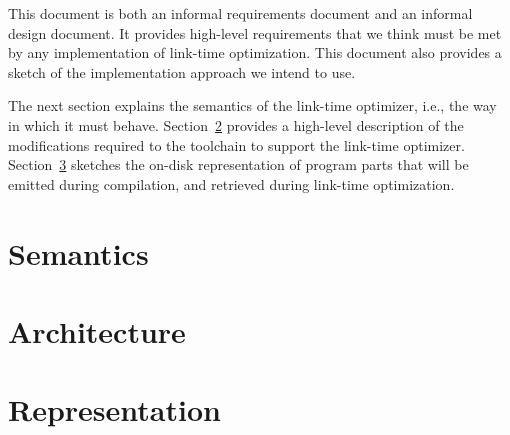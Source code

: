 \documentclass{article}
\begin{document}
This document is both an informal requirements document and an
informal design document.  It provides high-level requirements that we
think must be met by any implementation of link-time optimization.
This document also provides a sketch of the implementation approach we
intend to use.

The next section explains the semantics of the link-time optimizer,
i.e., the way in which it must behave.  Section~\ref{Architecture}
provides a high-level description of the modifications required to the
toolchain to support the link-time optimizer.
Section~\ref{Representation} sketches the on-disk representation of
program parts that will be emitted during compilation, and retrieved
during link-time optimization.

\section{Semantics}\label{Semantics}


\section{Architecture}\label{Architecture}


\section{Representation}\label{Representation}

\end{document}
